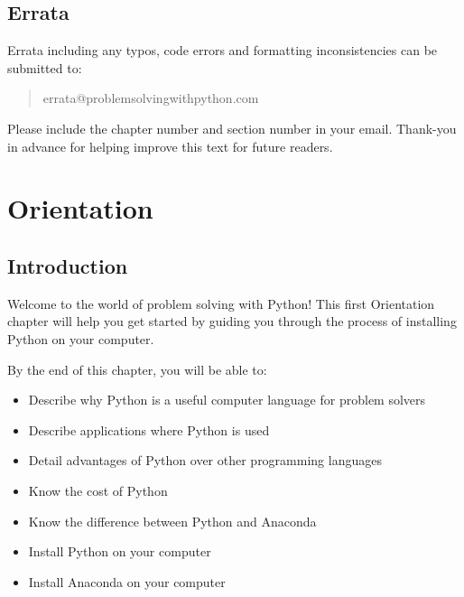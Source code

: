 \documentclass{book}
\begin{document}
    
        \hypertarget{errata}{%
\section{Errata}\label{errata}}
    




    
        Errata including any typos, code errors and formatting inconsistencies
can be submitted to:

\begin{quote}
errata@problemsolvingwithpython.com
\end{quote}

Please include the chapter number and section number in your email.
Thank-you in advance for helping improve this text for future readers.
    




    
        \hypertarget{orientation}{%
\chapter{Orientation}\label{orientation}}
    




    
        \hypertarget{introduction}{%
\section{Introduction}\label{introduction}}
    




    
        Welcome to the world of problem solving with Python! This first
Orientation chapter will help you get started by guiding you through the
process of installing Python on your computer.
    




    
        By the end of this chapter, you will be able to:

\begin{itemize}
\item
  Describe why Python is a useful computer language for problem solvers
\item
  Describe applications where Python is used
\item
  Detail advantages of Python over other programming languages
\item
  Know the cost of Python
\item
  Know the difference between Python and Anaconda
\item
  Install Python on your computer
\item
  Install Anaconda on your computer
\end{itemize}
        \newpage
\end{document}
